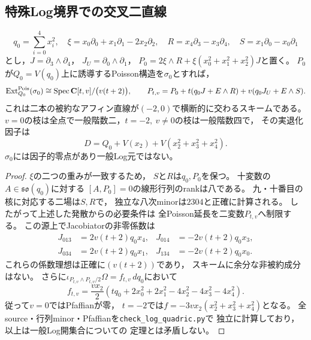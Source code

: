 \subsection{特殊Log境界での交叉二直線}
\label{subsec:quadric-log-boundary-node}
\begin{proposition}[特殊Log境界の二直線延長]\label{prop:quadric-special-log-node}
\[
q_0=\sum_{i=0}^4x_i^2,\quad
\xi=x_0\partial_0+x_1\partial_1-2x_2\partial_2,\quad
R=x_4\partial_3-x_3\partial_4,\quad
S=x_1\partial_0-x_0\partial_1
\]
とし，$J=\partial_3\wedge\partial_4$，
$J_U=\partial_0\wedge\partial_1$，
$P_0=2\xi\wedge R+\xi(x_0^2+x_1^2+x_2^2)J$と置く。
$P_0$が$Q_0=V(q_0)$上に誘導するPoisson構造を$\sigma_0$とすれば，
\[
 \operatorname{Ext}^{\mathrm{Pois}}_{Q_0}(\sigma_0)\cong
 \operatorname{Spec}\mathbf C[t,v]/\bigl(v(t+2)\bigr),
\qquad
 P_{t,v}=P_0+t(q_0J+E\wedge R)+v(q_0J_U+E\wedge S).
\]
これは二本の被約なアフィン直線が$(-2,0)$で横断的に交わるスキームである。
$v=0$の枝は全点で一般階数二，$t=-2,\ v\ne0$の枝は一般階数四で，
その実退化因子は
\[
 D=Q_0+V(x_2)+V(x_2^2+x_3^2+x_4^2).
\]
$\sigma_0$には因子的零点があり一般Log元ではない。
\end{proposition}
\begin{proof}
$\xi$の二つの重みが一致するため，
$S$と$R$は$q_0,P_0$を保つ。
十変数の$A\in\mathfrak{so}(q_0)$に対する
$[A,P_0]=0$の線形行列のrankは八である。
九・十番目の核に対応する二場は$S,R$で，
独立な八次minorは$2304$と正確に計算される。
したがって上述した発散からの必要条件は
全Poisson延長を二変数$P_{t,v}$へ制限する。
この源上でJacobiatorの非零係数は
\[
\begin{aligned}
 J_{013}&=2v(t+2)q_0x_4,&
 J_{014}&=-2v(t+2)q_0x_3,\\
 J_{034}&=2v(t+2)q_0x_1,&
 J_{134}&=-2v(t+2)q_0x_0.
\end{aligned}
\]
これらの係数理想は正確に$(v(t+2))$であり，
スキームに余分な非被約成分はない。
さらに$\iota_{P_{t,v}\wedge P_{t,v}/2}\Omega=f_{t,v}\,dq_0$において
\[
 f_{t,v}=\frac{vx_2}{2}
 (tq_0+2x_0^2+2x_1^2-4x_2^2-4x_3^2-4x_4^2).
\]
従って$v=0$ではPfaffianが零，
$t=-2$では$f=-3vx_2(x_2^2+x_3^2+x_4^2)$となる。
全source・行列minor・Pfaffianを\texttt{check\_log\_quadric.py}で
独立に計算しており，以上は一般Log開集合についての
定理とは矛盾しない。
\end{proof}









